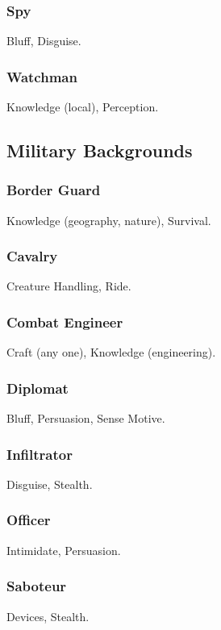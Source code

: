 \subsubsection{Spy}
 Bluff, Disguise.

\subsubsection{Watchman}
 Knowledge (local), Perception.

\subsection{Military Backgrounds}

\subsubsection{Border Guard}
 Knowledge (geography, nature), Survival.

\subsubsection{Cavalry}
 Creature Handling, Ride.

\subsubsection{Combat Engineer}
 Craft (any one), Knowledge (engineering).

\subsubsection{Diplomat}
 Bluff, Persuasion, Sense Motive.

\subsubsection{Infiltrator}
 Disguise, Stealth.

\subsubsection{Officer}
 Intimidate, Persuasion.

\subsubsection{Saboteur}
 Devices, Stealth.

